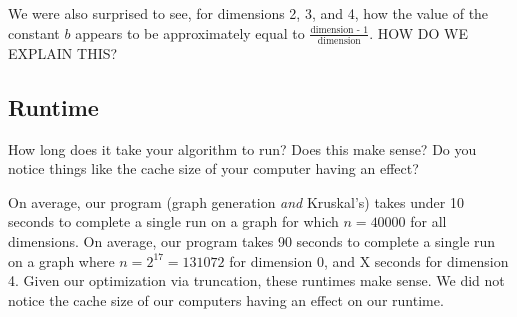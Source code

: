 \documentclass[solution, letterpaper]{cs121}
\begin{document}
We were also surprised to see, for dimensions 2, 3, and 4, how the value of the constant $b$ appears to be approximately equal to $\frac{\text{dimension - 1}}{\text{dimension}}$. HOW DO WE EXPLAIN THIS? 

\subsection*{Runtime}
How long does it take your algorithm to run? Does this make sense? Do you notice things like the cache size of your computer having an effect?

On average, our program (graph generation \emph{and} Kruskal's) takes under 10 seconds to complete a single run on a graph for which $n = 40000$ for all dimensions. On average, our program takes 90 seconds to complete a single run on a graph where $n = 2^{17} = 131072$ for dimension 0, and X seconds for dimension 4. Given our optimization via truncation, these runtimes make sense. We did not notice the cache size of our computers having an effect on our runtime.
\end{document}
